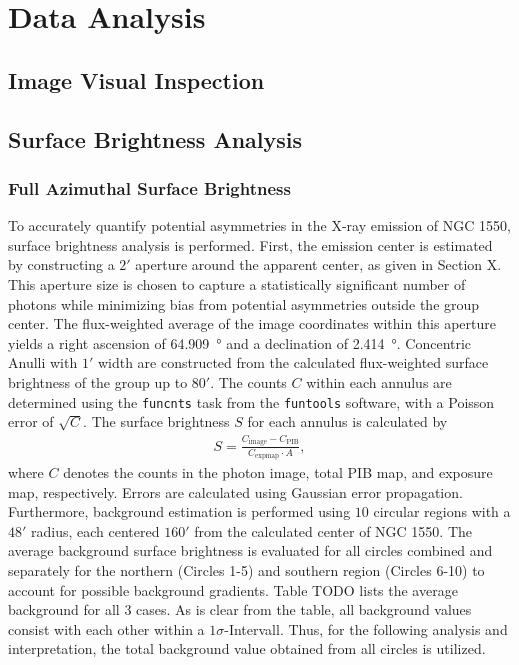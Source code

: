 
\chapter{Data Analysis}
\label{sec:data_analysis}
\section{Image Visual Inspection}
\section{Surface Brightness Analysis}
\subsection{Full Azimuthal Surface Brightness}
To accurately quantify potential asymmetries in the X-ray emission of NGC 1550, surface brightness analysis is performed. First, the emission center is estimated by constructing a \(2'\) aperture around the apparent center, as given in Section X. This aperture size is chosen to capture a statistically significant number of photons while minimizing bias from potential asymmetries outside the group center. The flux-weighted average of the image coordinates within this aperture yields a right ascension of \SI{64.909}{\degree} and a declination of \SI{2.414}{\degree}. Concentric Anulli with \(1'\) width are constructed from the calculated flux-weighted surface brightness of the group up to \(80'\). The counts \(C\) within each annulus are determined using the \texttt{funcnts} task from the \texttt{funtools} software, with a Poisson error of \(\sqrt{C}\). The surface brightness \(S\) for each annulus is calculated by
\begin{align*}
    S = \frac{C_\text{image} - C_\text{PIB}}{C_\text{expmap}\cdot A},
\end{align*}
where \(C\) denotes the counts in the photon image, total PIB map, and exposure map, respectively. Errors are calculated using Gaussian error propagation. Furthermore, background estimation is performed using \(10\) circular regions with a \(48'\) radius, each centered \(160'\) from the calculated center of NGC 1550. The average background surface brightness is evaluated for all circles combined and separately for the northern (Circles 1-5) and southern region (Circles 6-10) to account for possible background gradients. Table TODO lists the average background for all 3 cases. As is clear from the table, all background values consist with each other within a \(1\sigma\)-Intervall. Thus, for the following analysis and interpretation, the total background value obtained from all circles is utilized. 
